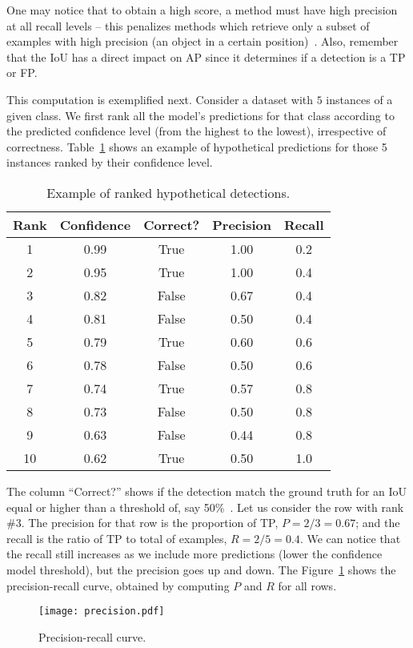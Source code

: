 One may notice that to obtain a high score, a method must have high precision at all recall levels -- this penalizes methods which retrieve only a subset of examples with high precision (\eg an object in a certain position)~\cite{Everingham10}.
Also, remember that the IoU has a direct impact on AP since it determines if a detection is a TP or FP.

This computation is exemplified next.
Consider a dataset with $5$ instances of a given class.
We first rank all the model's predictions for that class according to the predicted confidence level (from the highest to the lowest), irrespective of correctness.
Table~\ref{tab:ex_rank_detections} shows an example of hypothetical predictions for those 5 instances ranked by their confidence level.
%
\begin{table}[th]
\centering
\caption{Example of ranked hypothetical detections.}
\label{tab:ex_rank_detections}
\begin{tabular}{ccccc}
\toprule
Rank &  Confidence &  Correct? &  Precision &  Recall \\
\midrule
1 &    0.99 &      True &   1.00 &     0.2 \\
2 &    0.95 &      True &   1.00 &     0.4 \\
3 &    0.82 &     False &   0.67 &     0.4 \\
4 &    0.81 &     False &   0.50 &     0.4 \\
5 &    0.79 &      True &   0.60 &     0.6 \\
6 &    0.78 &     False &   0.50 &     0.6 \\
7 &    0.74 &      True &   0.57 &     0.8 \\
8 &    0.73 &     False &   0.50 &     0.8 \\
9 &    0.63 &     False &   0.44 &     0.8 \\
10 &   0.62 &      True &   0.50 &     1.0 \\
\bottomrule
\end{tabular}
\end{table}
%
The column ``Correct?'' shows if the detection match the ground truth for an IoU equal or higher than a threshold of, say 50\%~\cite{Everingham10}.
%
Let us consider the row with rank \#3.
The precision for that row is the proportion of TP, $P=2/3=0.67$;
and the recall is the ratio of TP to total of examples, $R = 2/5 = 0.4$.
We can notice that the recall still increases as we include more predictions (lower the confidence model threshold), but the precision goes up and down.
The Figure~\ref{fig:prec-rec_curve} shows the precision-recall curve, obtained by computing $P$ and $R$ for all rows.
%
\begin{figure}[th]
	\centering
	\texttt{[image: precision.pdf]}
	\caption{Precision-recall curve.}
	\label{fig:prec-rec_curve}
\end{figure}


